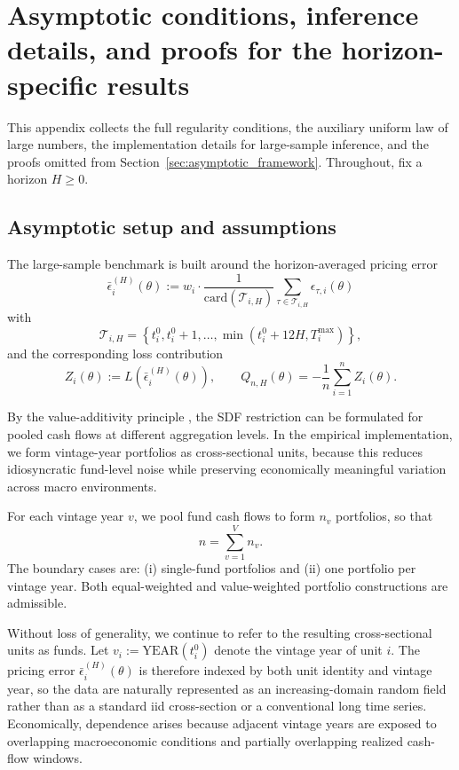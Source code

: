 \section{Asymptotic conditions, inference details, and proofs for the horizon-specific results}
\label{sec:proofs_asymptotics_H}



\noindent
This appendix collects the full regularity conditions, the auxiliary uniform law of large numbers, the implementation details for large-sample inference, and the proofs omitted from Section~\ref{sec:asymptotic_framework}. Throughout, fix a horizon $H \ge 0$.

\subsection{Asymptotic setup and assumptions}

The large-sample benchmark is built around the horizon-averaged pricing error
\[
\bar{\epsilon}^{(H)}_i(\theta)
:=
w_i
\cdot
\frac{1}{\mathrm{card}(\mathcal T_{i,H})}
\sum_{\tau \in \mathcal T_{i,H}}
\epsilon_{\tau,i}(\theta)
\]
with
\[
\mathcal T_{i,H}
=
\left\{
t_i^0,t_i^0+1,\dots,\min(t_i^0+12H,T_i^{\max})
\right\},
\]
and the corresponding loss contribution
\[
Z_i(\theta)
:=
L\!\left(\bar\epsilon_i^{(H)}(\theta)\right),
\qquad
Q_{n,H}(\theta)
=
-
\frac{1}{n}
\sum_{i=1}^n Z_i(\theta).
\]

By the value-additivity principle \citep{HR87}, the SDF restriction can be formulated for pooled cash flows at different aggregation levels. In the empirical implementation, we form vintage-year portfolios as cross-sectional units, because this reduces idiosyncratic fund-level noise while preserving economically meaningful variation across macro environments.

\begin{assume}
	\label{as:portfolio}
	For each vintage year \(v\), we pool fund cash flows to form \(n_v\) portfolios, so that
	\[
	n = \sum_{v=1}^V n_v.
	\]
	The boundary cases are: (i) single-fund portfolios and (ii) one portfolio per vintage year. Both equal-weighted and value-weighted portfolio constructions are admissible.
\end{assume}

Without loss of generality, we continue to refer to the resulting cross-sectional units as funds. Let \(v_i := \mathrm{YEAR}(t_i^0)\) denote the vintage year of unit \(i\). The pricing error \(\bar{\epsilon}^{(H)}_i(\theta)\) is therefore indexed by both unit identity and vintage year, so the data are naturally represented as an increasing-domain random field rather than as a standard iid cross-section or a conventional long time series. Economically, dependence arises because adjacent vintage years are exposed to overlapping macroeconomic conditions and partially overlapping realized cash-flow windows.

